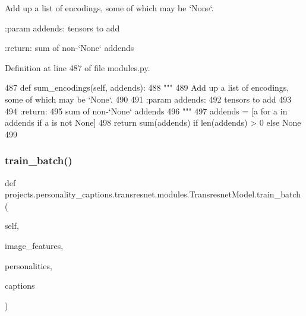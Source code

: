 \begin{DoxyVerb}Add up a list of encodings, some of which may be `None`.

:param addends:
    tensors to add

:return:
    sum of non-`None` addends
\end{DoxyVerb}
 

Definition at line 487 of file modules.\+py.


\begin{DoxyCode}
487     \textcolor{keyword}{def }sum\_encodings(self, addends):
488         \textcolor{stringliteral}{"""}
489 \textcolor{stringliteral}{        Add up a list of encodings, some of which may be `None`.}
490 \textcolor{stringliteral}{}
491 \textcolor{stringliteral}{        :param addends:}
492 \textcolor{stringliteral}{            tensors to add}
493 \textcolor{stringliteral}{}
494 \textcolor{stringliteral}{        :return:}
495 \textcolor{stringliteral}{            sum of non-`None` addends}
496 \textcolor{stringliteral}{        """}
497         addends = [a \textcolor{keywordflow}{for} a \textcolor{keywordflow}{in} addends \textcolor{keywordflow}{if} a \textcolor{keywordflow}{is} \textcolor{keywordflow}{not} \textcolor{keywordtype}{None}]
498         \textcolor{keywordflow}{return} sum(addends) \textcolor{keywordflow}{if} len(addends) > 0 \textcolor{keywordflow}{else} \textcolor{keywordtype}{None}
499 
\end{DoxyCode}
\mbox{\label{classprojects_1_1personality__captions_1_1transresnet_1_1modules_1_1TransresnetModel_a65f01ee6cdfb2d516e1e9be77e3d141a}} 
\subsubsection{\texorpdfstring{train\+\_\+batch()}{train\_batch()}}
{\footnotesize\ttfamily def projects.\+personality\+\_\+captions.\+transresnet.\+modules.\+Transresnet\+Model.\+train\+\_\+batch (\begin{DoxyParamCaption}\item[{}]{self,  }\item[{}]{image\+\_\+features,  }\item[{}]{personalities,  }\item[{}]{captions }\end{DoxyParamCaption})}

